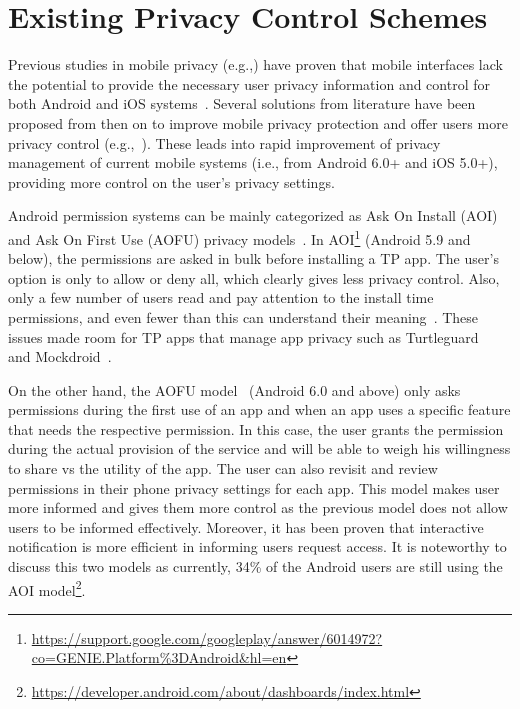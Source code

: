 \section{Existing Privacy Control Schemes}
Previous studies in mobile privacy (e.g.,\cite{felt2012android}) have proven that mobile interfaces lack the potential to provide the necessary user privacy information and control for both Android and iOS systems~\cite{lin2014modeling}. Several solutions from literature have been proposed from then on to improve mobile privacy protection and offer users more privacy control (e.g.,~\cite{beresford2011mockdroid}). These leads into rapid improvement of privacy management of current mobile systems (i.e., from Android 6.0+ and iOS 5.0+), providing more control on the user's privacy settings.

Android permission systems can be mainly categorized as Ask On Install (AOI) and Ask On First Use (AOFU) privacy models~\cite{tsai2017turtle, wijesekera2017feasibility}. In AOI\footnote{\url{https://support.google.com/googleplay/answer/6014972?co=GENIE.Platform\%3DAndroid&hl=en}} (Android 5.9 and below), the permissions are asked in bulk before installing a TP app. The user's option is only to allow or deny all, which clearly gives less privacy control. Also, only a few number of users read and pay attention to the install time permissions, and even fewer than this can understand their meaning~\cite{felt2012android,kelley2012conundrum}. These issues made room for TP apps that manage app privacy such as Turtleguard~\cite{tsai2017turtle} and Mockdroid~\cite{beresford2011mockdroid}. %

On the other hand, the AOFU model~\cite{tsai2017turtle} (Android 6.0 and above) only asks permissions during the first use of an app and when an app uses a specific feature that needs the respective permission. In this case, the user grants the permission during the actual provision of the service and will be able to weigh his willingness to share vs the utility of the app. The user can also revisit and review permissions in their phone privacy settings for each app. This model makes user more informed and gives them more control as the previous model does not allow users to be informed effectively\cite{fu2014field}. Moreover, it has been proven that interactive notification is more efficient in informing users request access\cite{fu2014field}. It is noteworthy to discuss this two models as currently, 34\% of the Android users are still using the AOI model\footnote{\url{https://developer.android.com/about/dashboards/index.html}}.


